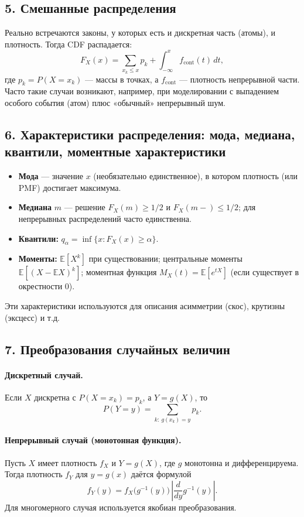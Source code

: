 \subsection*{5. Смешанные распределения}

Реально встречаются законы, у которых есть и дискретная часть (атомы), и плотность. Тогда CDF распадается:
\[
F_X(x) = \sum_{x_k\le x} p_k + \int_{-\infty}^x f_{\text{cont}}(t)\,dt,
\]
где $p_k=P(X=x_k)$ — массы в точках, а $f_\text{cont}$ — плотность непрерывной части. Часто такие случаи возникают, например, при моделировании с выпадением особого события (атом) плюс «обычный» непрерывный шум.

\subsection*{6. Характеристики распределения: мода, медиана, квантили, моментные характеристики}

\begin{itemize}
  \item \textbf{Мода} — значение $x$ (необязательно единственное), в котором плотность (или PMF) достигает максимума.
  \item \textbf{Медиана} $m$ — решение $F_X(m)\ge 1/2$ и $F_X(m-)\le 1/2$; для непрерывных распределений часто единственна.
  \item \textbf{Квантили:} $q_\alpha = \inf\{x: F_X(x)\ge \alpha\}$.
  \item \textbf{Моменты:} $\mathbb{E}[X^k]$ при существовании; центральные моменты $\mathbb{E}[(X-\mathbb{E}X)^k]$; моментная функция $M_X(t)=\mathbb{E}[e^{tX}]$ (если существует в окрестности $0$).
\end{itemize}

Эти характеристики используются для описания асимметрии (скос), крутизны (эксцесс) и т.д.

\subsection*{7. Преобразования случайных величин}

\paragraph{Дискретный случай.} Если $X$ дискретна с $P(X=x_k)=p_k$, а $Y=g(X)$, то
\[
P(Y=y) = \sum_{k:\ g(x_k)=y} p_k.
\]

\paragraph{Непрерывный случай (монотонная функция).} Пусть $X$ имеет плотность $f_X$ и $Y=g(X)$, где $g$ монотонна и дифференцируема. Тогда плотность $f_Y$ для $y=g(x)$ даётся формулой
\[
f_Y(y) = f_X\bigl(g^{-1}(y)\bigr)\, \left| \frac{d}{dy} g^{-1}(y)\right|.
\]
Для многомерного случая используется якобиан преобразования.

